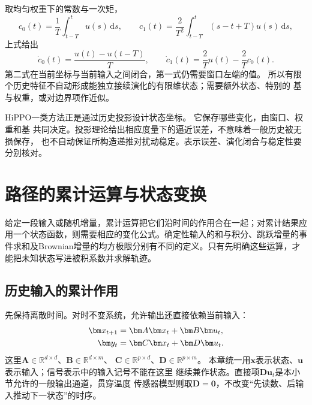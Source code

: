 取均匀权重下的常数与一次矩，
\[
  c_0(t)=\frac1T\int_{t-T}^t u(s)\,\mathrm ds,\qquad
  c_1(t)=\frac2{T^2}\int_{t-T}^t(s-t+T)u(s)\,\mathrm ds,
\]
上式给出
\[
  \dot c_0(t)=\frac{u(t)-u(t-T)}T,\qquad
  \dot c_1(t)=\frac2T u(t)-\frac2T c_0(t).
\]
第二式在当前坐标与当前输入之间闭合，第一式仍需要窗口左端的值。
所以有限个历史特征不自动形成能独立接续演化的有限维状态；需要额外状态、特别的
基与权重，或对边界项作近似。

HiPPO一类方法正是通过历史投影设计状态坐标。
它保存哪些变化，由窗口、权重和基
共同决定。投影理论给出相应度量下的逼近误差，不意味着一般历史被无损保存，
也不自动保证所构造递推对扰动稳定。表示误差、演化闭合与稳定性要分别核对。

\section{路径的累计运算与状态变换}
\label{sec:action-state-path-operations}
\label{sec:action-state-random-integrals}
给定一段输入或随机增量，累计运算把它们沿时间的作用合在一起；对累计结果应用一个状态函数，则需要相应的变化公式。确定性输入的和与积分、跳跃增量的事件求和及Brownian增量的均方极限分别有不同的定义。只有先明确这些运算，才能把未知状态写进被积系数并求解轨迹。

\subsection{历史输入的累计作用}
\label{sec:signal-analysis-state-history-kernels}

先保持离散时间。对时不变系统，允许输出还直接依赖当前输入：
\begin{align}
  \bm x_{t+1}&=\bm A\bm x_t+\bm B\bm u_t,\notag\\
  \bm y_t&=\bm C\bm x_t+\bm D\bm u_t.
  \label{eq:signal-analysis-lti-state-space}
\end{align}
这里$\bm A\in\mathbb R^{d\times d}$、$\bm B\in\mathbb R^{d\times m}$、
$\bm C\in\mathbb R^{p\times d}$、$\bm D\in\mathbb R^{p\times m}$。
本章统一用$\bm x$表示状态、$\bm u$表示输入；信号表示中的输入记号不能在这里
继续兼作状态。直接项$\bm D\bm u_t$是本小节允许的一般输出通道，贯穿温度
传感器模型则取$\bm D=\bm0$，不改变“先读数、后输入推动下一状态”的时序。

